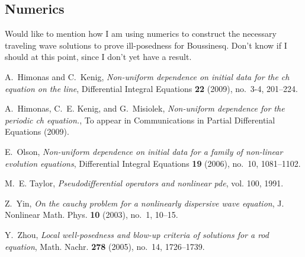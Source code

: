 \documentclass[12pt,reqno]{amsart}
\begin{document}
\subsection{Numerics} 
 \newpage
 \begin{framed}
   Would like to mention how I am using numerics to construct the necessary traveling
wave solutions to prove ill-posedness for Boussinesq. Don't know if I should at
this point, since I don't yet have a result.
\end{framed}
%
%
%
%
%
\providecommand{\bysame}{\leavevmode\hbox to3em{\hrulefill}\thinspace}
\providecommand{\MR}{\relax\ifhmode\unskip\space\fi MR }
\providecommand{\MRhref}[2]{%
  \href{http://www.ams.org/mathscinet-getitem?mr=#1}{#2}
}
\providecommand{\href}[2]{#2}
\begin{thebibliography}{HKM09}

A.~Himonas and C.~Kenig, \emph{Non-uniform dependence on initial data for
  the ch equation on the line}, Differential Integral Equations \textbf{22}
  (2009), no.~3-4, 201--224.

A.~Himonas, C.~E. Kenig, and G.~Misiolek, \emph{Non-uniform dependence for the
  periodic ch equation.}, To appear in Communications in Partial Differential
  Equations (2009).

E.~Olson, \emph{Non-uniform dependence on initial data for a family of
  non-linear evolution equations}, Differential Integral Equations \textbf{19}
  (2006), no.~10, 1081--1102.

M.~E. Taylor, \emph{Pseudodifferential operators and nonlinear pde}, vol. 100,
  1991.

Z.~Yin, \emph{On the cauchy problem for a nonlinearly dispersive wave
  equation}, J. Nonlinear Math. Phys. \textbf{10} (2003), no.~1, 10--15.

Y.~Zhou, \emph{Local well-posedness and blow-up criteria of solutions for a rod
  equation}, Math. Nachr. \textbf{278} (2005), no.~14, 1726--1739.

\end{thebibliography}


%
%
\end{document}
